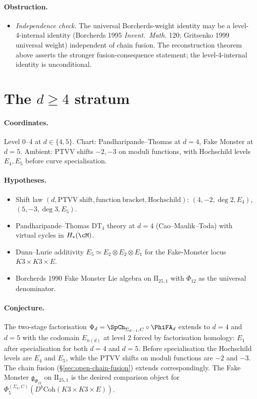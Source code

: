 \paragraph{Obstruction.}
\begin{itemize}[nosep]
\item \emph{Independence check.} The universal Borcherds-weight identity
  may be a level-4-internal identity (Borcherds 1995 \emph{Invent.\ Math.}
  120; Gritsenko 1999 universal weight) independent of chain fusion. The
  reconstruction theorem above asserts the stronger fusion-consequence
  statement; the level-4-internal identity is unconditional.
\end{itemize}

\section{The $d \geq 4$ stratum}
\label{sec:open-d-geq-4}

\paragraph{Coordinates.} Level 0--4 at $d \in \{4, 5\}$. Chart:
Pandharipande--Thomas at $d = 4$, Fake Monster at $d = 5$. Ambient:
PTVV shifts $-2,-3$ on moduli functions, with Hochschild levels
$E_4,E_5$ before curve specialisation.

\paragraph{Hypotheses.}
\begin{itemize}[nosep]
\item Shift law $(d,\mathrm{PTVV\ shift},\mathrm{function\ bracket},\mathrm{Hochschild})$:
  $(4,-2,\deg 2,E_4)$, $(5,-3,\deg 3,E_5)$.
\item Pandharipande--Thomas DT$_4$ theory at $d = 4$
  (Cao--Maulik--Toda) with virtual cycles in $H_*(\cM)$.
\item Dunn--Lurie additivity $E_5 \simeq E_2 \otimes E_2 \otimes E_1$
  for the Fake-Monster locus $K3 \times K3 \times E$.
\item Borcherds 1990 Fake Monster Lie algebra on $\mathrm{II}_{25, 1}$
  with $\Phi_{12}$ as the universal denominator.
\end{itemize}

\paragraph{Conjecture.} The two-stage
factorisation $\Phi_d = \SpCh_{\Sigma_{d-1}, C} \circ \PhiFA_d$ extends
to $d = 4$ and $d = 5$ with the codomain $E_{n(d)}$ at level 2 forced
by factorisation homology: $E_1$ after specialisation for both
$d=4$ and $d=5$. Before specialisation the Hochschild levels are
$E_4$ and $E_5$, while the PTVV shifts on moduli functions are
$-2$ and $-3$. The chain fusion (\S\ref{sec:open-chain-fusion})
extends correspondingly. The Fake Monster $\mathfrak{g}_{\Phi_{12}}$
on $\mathrm{II}_{25, 1}$ is the desired comparison object for
$\Phi^{(\Sigma_4, C)}_5(D^b\mathrm{Coh}(K3 \times K3 \times E))$.

